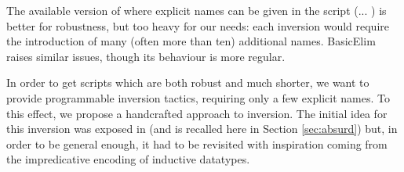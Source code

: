 %
The available version of \inversion where explicit names
can be given in the script (\inversion... \as)
is better for robustness, 
but too heavy for our needs:
each inversion would require the introduction of many (often more than ten)
additional names.
%
%
BasicElim raises similar issues, 
though its behaviour is more regular.

In order to get scripts which are both robust and much shorter,
we want to provide programmable inversion tactics,
requiring only a few explicit names. 
To this effect, we propose a handcrafted approach to inversion.
The initial idea for this inversion was exposed in \cite{small_inv}
(and is recalled here in Section \ref{sec:absurd})
but, in order to be general enough,
it had to be revisited with inspiration coming from
the impredicative encoding of inductive datatypes.





%

